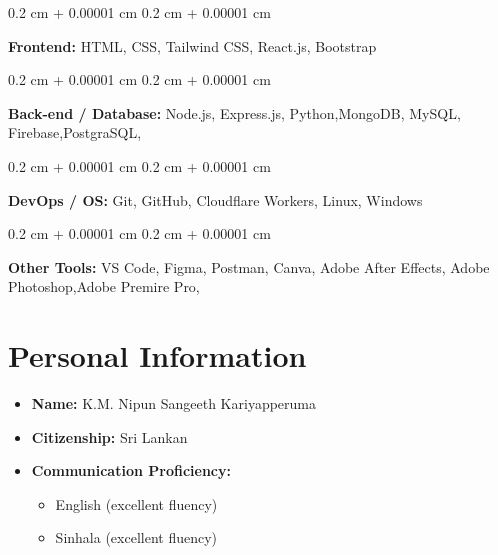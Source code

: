 \documentclass[10pt, letterpaper]{article}
\newenvironment{highlights}{
    \begin{itemize}[
        topsep=0.10 cm,
        parsep=0.10 cm,
        partopsep=0pt,
        itemsep=0pt,
        leftmargin=0.4 cm + 10pt
    ]
}{
    \end{itemize}
} %
\newenvironment{onecolentry}{
    \begin{adjustwidth}{
        0.2 cm + 0.00001 cm
    }{
        0.2 cm + 0.00001 cm
    }
}{
    \end{adjustwidth}
} %
\begin{document}
\vspace{0.2 cm}

\begin{onecolentry}
    \textbf{Frontend:} HTML, CSS, Tailwind CSS, React.js, Bootstrap
\end{onecolentry}
\vspace{0.2 cm}
\begin{onecolentry}
    \textbf{Back-end / Database:} Node.js, Express.js, Python,MongoDB, MySQL, Firebase,PostgraSQL, 
\end{onecolentry}
\vspace{0.2 cm}
\begin{onecolentry}
    \textbf{DevOps / OS:} Git, GitHub, Cloudflare Workers, Linux, Windows
\end{onecolentry}
\vspace{0.2 cm}
\begin{onecolentry}
    \textbf{Other Tools:} VS Code, Figma, Postman, Canva,  Adobe After Effects, Adobe Photoshop,Adobe Premire Pro,
\end{onecolentry}





        \section{Personal Information }

\begin{highlights}
    \item \textbf{Name:} K.M. Nipun Sangeeth Kariyapperuma
    \item \textbf{Citizenship:} Sri Lankan
    \item \textbf{Communication Proficiency:}
    \begin{itemize}
        \item English (excellent fluency)
        \item Sinhala (excellent fluency)
    \end{itemize}
\end{highlights}

        
\end{document}
